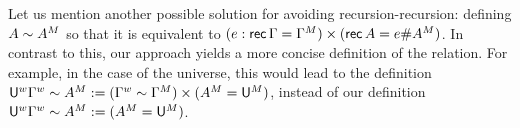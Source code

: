 Let us mention another possible solution for avoiding recursion-recursion:
defining $A\sim{A}^M$ so that it is equivalent to $(e:\mathsf{rec}\,\Gamma
= {\Gamma}^M)\times (\mathsf{rec}\,A = e\#{A}^M)$.
In contrast to this, our approach
yields a more concise definition of the relation.
For example, in the case of the universe, this would lead
to the definition
  $  {\mathsf{U}}^w{\Gamma}^w \sim {A}^M := ({\Gamma}^w\sim{\Gamma}^M) \times ({A}^M = {\mathsf{U}}^M)$,
  instead of
  our definition
  $  {\mathsf{U}}^w{\Gamma}^w \sim {A}^M := ({A}^M = {\mathsf{U}}^M)$.



